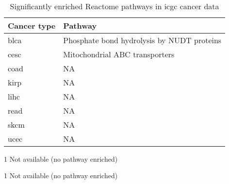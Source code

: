 \begin{appendices}
\begin{table}[htpb]
	\centering
	\caption{Significantly enriched Reactome pathways in \gls{icgc} cancer data}
	\label{tab:sig_path_reactome}
	\begin{threeparttable}
		\begin{tabular}{ll}
			Cancer type & Pathway \\
			\hline
			\hline
				\rule{0pt}{2.25ex}\gls{blca} & Phosphate bond hydrolysis by NUDT proteins \\
				\gls{cesc}                   & Mitochondrial ABC transporters             \\
				\gls{coad}   & NA\tnote{1}               \\
				\gls{kirp}   & NA             \\
				\gls{lihc}   & NA             \\
				\gls{read}   & NA             \\
				\gls{skcm}   & NA             \\
				\gls{ucec}   & NA             \\
			\hline
			\hline
		\end{tabular}
		\begin{tablenotes}
			\item [1] Not available (no pathway enriched)
		\end{tablenotes}
	\end{threeparttable}
\end{table}

\newpage

	\begin{TableNotes}
		\begin{footnotesize}
			\item [1] Not available (no pathway enriched)
		\end{footnotesize}
	\end{TableNotes}


\end{appendices}

